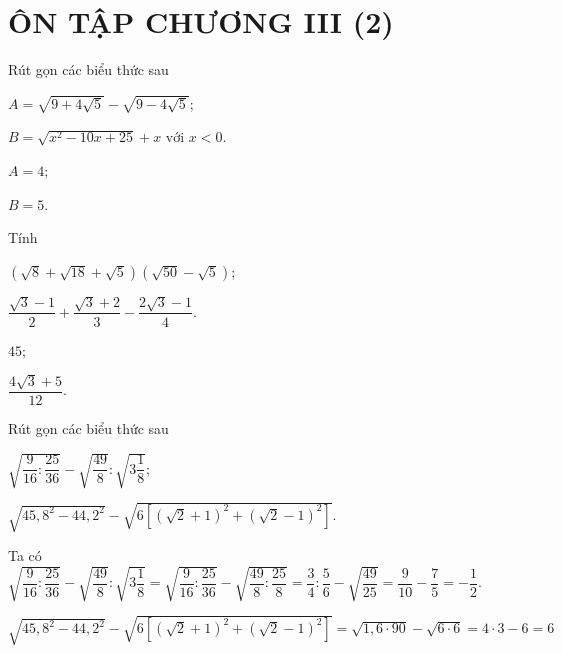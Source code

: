 \section*{ÔN TẬP CHƯƠNG III (2)}
\begin{bt}%
	Rút gọn các biểu thức sau 
	\begin{listEX}[2]
	\item $A=\sqrt{9 + 4\sqrt{5}} - \sqrt{9 - 4\sqrt{5}}$;
	\item $B=\sqrt{x^2 - 10x + 25} + x\text{ với }x<0$.
	\end{listEX}
	\loigiai
	{
	\begin{listEX}[2]
	\item $A=4$;
	\item $B=5$.
	\end{listEX}
	}
\end{bt}
\begin{bt}%
	Tính
	\begin{listEX}[2]
	\item $(\sqrt{8} + \sqrt{18} + \sqrt{5})(\sqrt{50} - \sqrt{5})$;
	\item $\dfrac{\sqrt{3} - 1}{2} + \dfrac{\sqrt{3} + 2}{3} - \dfrac{2\sqrt{3} - 1}{4}$.
	\end{listEX}
	\loigiai
	{
	\begin{listEX}[2]
	\item $45$;
	\item $\dfrac{4\sqrt{3} + 5}{12}$.
	\end{listEX}
	}
\end{bt}
\begin{bt}%
	Rút gọn các biểu thức sau
\begin{listEX}[2]
	\item $\sqrt{\dfrac{9}{16}:\dfrac{25}{36}} - \sqrt{\dfrac{49}{8}}:\sqrt{3\dfrac{1}{8}}$;
	\item $\sqrt{45{,}8^2 - 44{,}2^2} - \sqrt{6\left[(\sqrt{2} + 1)^2 + (\sqrt{2} - 1)^2\right]}$.
\end{listEX}
	\loigiai
	{
\begin{listEX}
	\item Ta có $\sqrt{\dfrac{9}{16}:\dfrac{25}{36}} - \sqrt{\dfrac{49}{8}}:\sqrt{3\dfrac{1}{8}}=\sqrt{\dfrac{9}{16}:\dfrac{25}{36}} - \sqrt{\dfrac{49}{8}:\dfrac{25}{8}}=\dfrac{3}{4}:\dfrac{5}{6} - \sqrt{\dfrac{49}{25}}=\dfrac{9}{10} - \dfrac{7}{5}= - \dfrac{1}{2}$.
	\item $\sqrt{45{,}8^2 - 44{,}2^2} - \sqrt{6\left[(\sqrt{2} + 1)^2 + (\sqrt{2} - 1)^2\right]} =\sqrt{1{,}6\cdot90} - \sqrt{6\cdot6}=4\cdot3 - 6=6$
\end{listEX}
	}
\end{bt}
